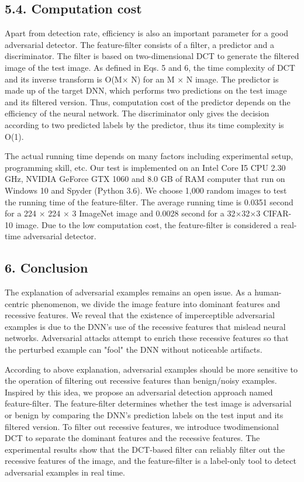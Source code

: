 \documentclass{article}
\begin{document}
\subsection{5.4. Computation cost}

Apart from detection rate, efficiency is also an important parameter for a good adversarial detector. The feature-filter consists of a filter, a predictor and a discriminator. The filter is based on two-dimensional DCT to generate the filtered image of the test image. As defined in Eqs. 5 and 6, the time complexity of DCT and its inverse transform is O(M× N) for an M × N image. The predictor is made up of the target DNN, which performs two predictions on the test image and its filtered version. Thus, computation cost of the predictor depends on the efficiency of the neural network. The discriminator only gives the decision according to two predicted labels by the predictor, thus its time complexity is O(1).

The actual running time depends on many factors including experimental setup, programming skill, etc. Our test is implemented on an Intel Core I5 CPU 2.30 GHz, NVIDIA GeForce GTX 1060 and 8.0 GB of RAM computer that run on Windows 10 and Spyder (Python 3.6). We choose 1,000 random images to test the running time of the feature-filter. The average running time is 0.0351 second for a 224 × 224 × 3 ImageNet image and 0.0028 second for a 32×32×3 CIFAR-10 image. Due to the low computation cost, the feature-filter is considered a real-time adversarial detector.

\subsection{6. Conclusion}

The explanation of adversarial examples remains an open issue. As a human-centric phenomenon, we divide the image feature into dominant features and recessive features. We reveal that the existence of imperceptible adversarial examples is due to the DNN's use of the recessive features that mislead neural networks. Adversarial attacks attempt to enrich these recessive features so that the perturbed example can "fool" the DNN without noticeable artifacts.

According to above explanation, adversarial examples should be more sensitive to the operation of filtering out recessive features than benign/noisy examples. Inspired by this idea, we propose an adversarial detection approach named feature-filter. The feature-filter determines whether the test image is adversarial or benign by comparing the DNN's prediction labels on the test input and its filtered version. To filter out recessive features, we introduce twodimensional DCT to separate the dominant features and the recessive features. The experimental results show that the DCT-based filter can reliably filter out the recessive features of the image, and the feature-filter is a label-only tool to detect adversarial examples in real time.
\end{document}
